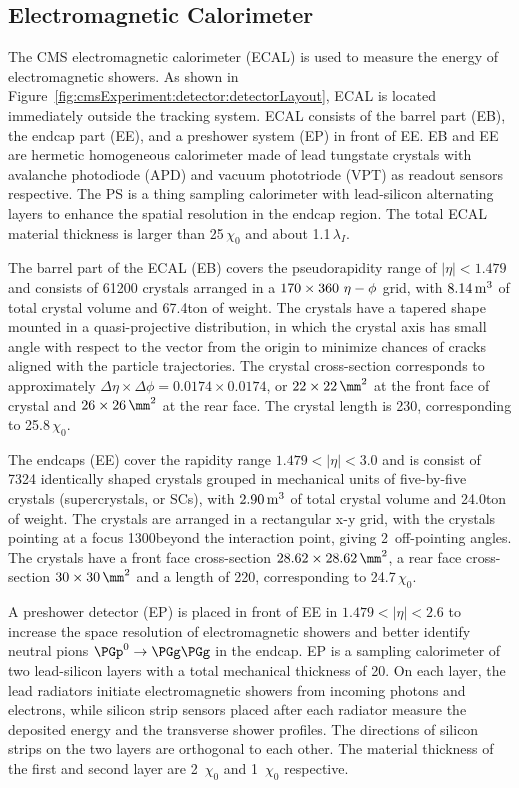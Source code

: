 \subsection{Electromagnetic Calorimeter}
\label{sec:cmsExperiment:detector:ecal}

The CMS electromagnetic calorimeter (ECAL) \cite{cms:ecalTdr:CMS:1997ysd} is used to measure the energy of electromagnetic showers. As shown in Figure~\ref{fig:cmsExperiment:detector:detectorLayout}, ECAL is located immediately outside the tracking system. ECAL consists of the barrel part (EB), the endcap part (EE), and a preshower system (EP) in front of EE. EB and EE are hermetic homogeneous calorimeter made of lead tungstate crystals with avalanche photodiode (APD) and vacuum phototriode (VPT)  as readout sensors respective. The PS is a thing sampling calorimeter with lead-silicon alternating layers to enhance the spatial resolution in the endcap region. The total ECAL material thickness is larger than 25\,$\chi_0$ and about 1.1\,$\lambda_I$.

The barrel part of the ECAL (EB) covers the pseudorapidity range of $|\eta|< 1.479$ and consists of 61200 crystals arranged in a $\rm 170\times360 ~ \eta - \phi$ grid, with $\rm 8.14\,m^3$ of total crystal volume and 67.4\unit{ton} of weight. The crystals have a tapered shape mounted in a quasi-projective distribution, in which the crystal axis has small angle with respect to the vector from the origin to minimize chances of cracks aligned with the particle trajectories. The crystal cross-section corresponds to approximately $\Delta \eta \times \Delta\phi = 0.0174 \times 0.0174$, or $\rm 22 \times 22 \, \mm^2$ at the front face of crystal and $\rm 26\times26 \, \mm^2$ at the rear face. The crystal length is 230\mm, corresponding to 25.8\,$\chi_0$.

The endcaps (EE) cover the rapidity range $1.479 < |\eta| < 3.0$ and is consist of 7324 identically shaped crystals grouped in mechanical units of five-by-five crystals (supercrystals, or SCs), with $\rm 2.90\,m^3$ of total crystal volume and 24.0\unit{ton} of weight. The crystals are arranged in a rectangular x-y grid, with the crystals pointing at a focus 1300\mm beyond the interaction point, giving 2\de ~off-pointing angles. The crystals have a front face cross-section $\rm 28.62\times28.62 \, \mm^2$, a rear face cross-section $\rm 30\times30 \, \mm^2$ and a length of 220\mm, corresponding to 24.7\,$\chi_0$.

A preshower detector (EP) is placed in front of EE in $1.479 < |\eta| < 2.6$ to increase the space resolution of electromagnetic showers and better identify neutral pions $\PGp^0 \to \PGg \PGg$ in the endcap. EP is a sampling calorimeter of two lead-silicon layers with a total mechanical thickness of 20\cm. On each layer, the lead radiators initiate electromagnetic showers from incoming photons and electrons, while silicon strip sensors placed after each radiator measure the deposited energy and the transverse shower profiles. The directions of silicon strips on the two layers are orthogonal to each other. The material thickness of the first and second layer are 2\, $\chi_0$ and 1\, $\chi_0$ respective.



